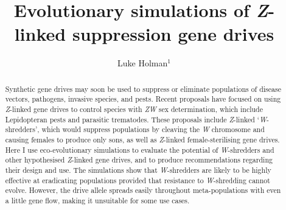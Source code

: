 \documentclass[]{rsos}%
\begin{document}
\title{Evolutionary simulations of \emph{Z}-linked suppression gene drives}

\author{
Luke Holman$^{1}$}

\address{
  $^{1}$School of BioSciences, The University of Melbourne, Victoria 3010,
Australia.}
\subject{
Evolutionary biology,
Theoretical modelling,
Gene drives}



\begin{abstract}
Synthetic gene drives may soon be used to suppress or eliminate
populations of disease vectors, pathogens, invasive species, and pests.
Recent proposals have focused on using \emph{Z}-linked gene drives to
control species with \emph{ZW} sex determination, which include
Lepidopteran pests and parasitic trematodes. These proposals include
\emph{Z}-linked `\emph{W}-shredders', which would suppress populations
by cleaving the \emph{W} chromosome and causing females to produce only
sons, as well as \emph{Z}-linked female-sterilising gene drives. Here I
use eco-evolutionary simulations to evaluate the potential of
\emph{W}-shredders and other hypothesised \emph{Z}-linked gene drives,
and to produce recommendations regarding their design and use. The
simulations show that \emph{W}-shredders are likely to be highly
effective at eradicating populations provided that resistance to
\emph{W}-shredding cannot evolve. However, the drive allele spreads
easily throughout meta-populations with even a little gene flow, making
it unsuitable for some use cases.
\end{abstract}

\providecommand{\tightlist}{%
  \setlength{\itemsep}{0pt}\setlength{\parskip}{0pt}}
\providecommand{\EndFirstPage}{%
}

\maketitle
\end{document}
